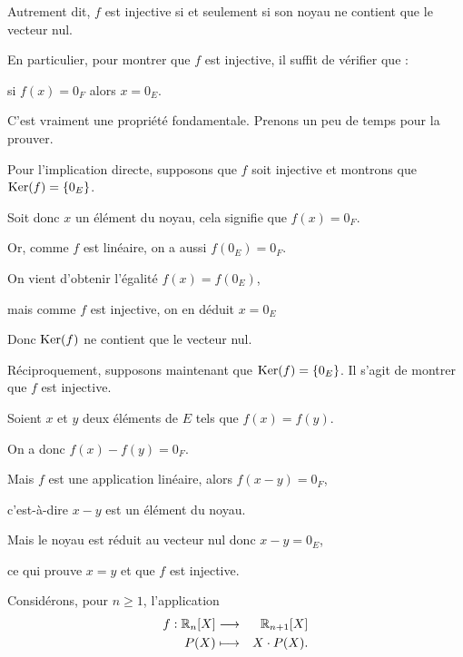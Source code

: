 Autrement dit, $f$ est injective si et seulement si son noyau ne contient que le vecteur nul.

\change
En particulier, pour montrer que $f$ est injective, il suffit de vérifier que : 

si $f(x)=0_F$ alors $x=0_E$.

\change

C'est vraiment une propriété fondamentale. Prenons un peu de temps pour la prouver.

\change

Pour l'implication directe, supposons que $f$ soit injective et montrons que $\mathop{\text{Ker}}\nolimits(f)=\{0_E\}$. 

\change

Soit donc $x$ un élément du noyau, cela signifie que $f(x)=0_{F}$. 

\change

Or, comme $f$ est linéaire, on a aussi $f(0_{E})=0_{F}$. 

\change

On vient d'obtenir l'égalité $f(x)=f(0_{E})$,

mais comme $f$ est injective, on en déduit $x=0_{E}$ 

Donc $\mathop{\text{Ker}}\nolimits (f)$ ne contient que le vecteur nul.

\change

Réciproquement, supposons maintenant que $\mathop{\text{Ker}}\nolimits (f)=\{0_E\}$. 
Il s'agit de montrer que $f$ est injective.

\change

Soient $x$ et $y$ deux éléments de $E$ tels que 
$f(x)=f(y)$. 

On a donc $f(x)-f(y)=0_{F}$.

\change

Mais $f$ est une application linéaire, alors $f(x-y)=0_{F}$, 

\change

c'est-à-dire $x-y$ est un élément du noyau. 

\change

Mais le noyau est réduit au vecteur nul donc $x-y=0_{E}$, 

ce qui prouve $x=y$ et que $f$ est injective.


\diapo

Considérons, pour $n\ge1$, l'application 
\begin{eqnarray*}
f : \mathbb{R}_n[X] & \longrightarrow & \mathbb{R}_{n+1}[X]\\
P(X)  & \longmapsto & X \cdot P(X).
\end{eqnarray*}

